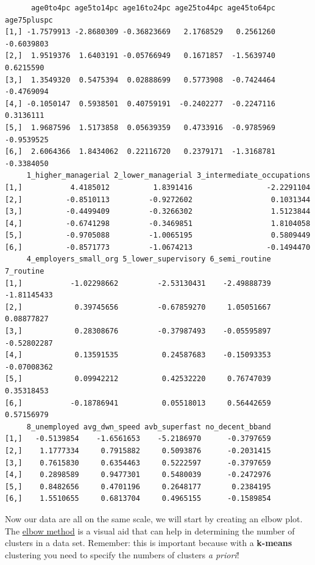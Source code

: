 \documentclass[
  letterpaper,
  DIV=11,
  numbers=noendperiod]{scrreprt}
\begin{document}
\begin{verbatim}
      age0to4pc age5to14pc age16to24pc age25to44pc age45to64pc age75pluspc
[1,] -1.7579913 -2.8680309 -0.36823669   2.1768529   0.2561260  -0.6039803
[2,]  1.9519376  1.6403191 -0.05766949   0.1671857  -1.5639740   0.6215590
[3,]  1.3549320  0.5475394  0.02888699   0.5773908  -0.7424464  -0.4769094
[4,] -0.1050147  0.5938501  0.40759191  -0.2402277  -0.2247116   0.3136111
[5,]  1.9687596  1.5173858  0.05639359   0.4733916  -0.9785969  -0.9539525
[6,]  2.6064366  1.8434062  0.22116720   0.2379171  -1.3168781  -0.3384050
     1_higher_managerial 2_lower_managerial 3_intermediate_occupations
[1,]           4.4185012          1.8391416                 -2.2291104
[2,]          -0.8510113         -0.9272602                  0.1031344
[3,]          -0.4499409         -0.3266302                  1.5123844
[4,]          -0.6741298         -0.3469851                  1.8104058
[5,]          -0.9705088         -1.0065195                  0.5809449
[6,]          -0.8571773         -1.0674213                 -0.1494470
     4_employers_small_org 5_lower_supervisory 6_semi_routine   7_routine
[1,]           -1.02298662         -2.53130431    -2.49888739 -1.81145433
[2,]            0.39745656         -0.67859270     1.05051667  0.08877827
[3,]            0.28308676         -0.37987493    -0.05595897 -0.52802287
[4,]            0.13591535          0.24587683    -0.15093353 -0.07008362
[5,]            0.09942212          0.42532220     0.76747039  0.35318453
[6,]           -0.18786941          0.05518013     0.56442659  0.57156979
     8_unemployed avg_dwn_speed avb_superfast no_decent_bband
[1,]   -0.5139854    -1.6561653    -5.2186970      -0.3797659
[2,]    1.1777334     0.7915882     0.5093876      -0.2031415
[3,]    0.7615830     0.6354463     0.5222597      -0.3797659
[4,]    0.2898589     0.9477301     0.5480039      -0.2472976
[5,]    0.8482656     0.4701196     0.2648177       0.2384195
[6,]    1.5510655     0.6813704     0.4965155      -0.1589854
\end{verbatim}

Now our data are all on the same scale, we will start by creating an
elbow plot. The
\href{https://en.wikipedia.org/wiki/Elbow_method_(clustering)\#:~:text=In\%20cluster\%20analysis\%2C\%20the\%20elbow,number\%20of\%20clusters\%20to\%20use\%60}{elbow
method} is a visual aid that can help in determining the number of
clusters in a data set. Remember: this is important because with a
\textbf{k-means} clustering you need to specify the numbers of clusters
\emph{a priori}!
\end{document}
